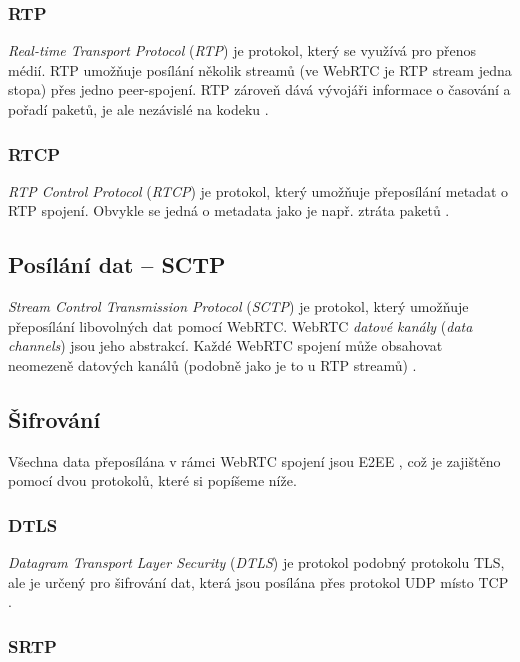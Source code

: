 \subsubsection{RTP}\label{rtp}

\textit{Real-time Transport Protocol} (\textit{RTP}) je protokol, který se
využívá pro přenos médií. RTP umožňuje posílání několik streamů (ve WebRTC je
RTP stream jedna stopa) přes jedno peer-spojení. RTP zároveň dává vývojáři
informace o časování a pořadí paketů, je ale nezávislé na kodeku
\cite{WebRTCForTheCurious}.

\subsubsection{RTCP}\label{rtcp}

\textit{RTP Control Protocol} (\textit{RTCP}) je protokol, který umožňuje
přeposílání metadat o RTP spojení. Obvykle se jedná o metadata jako je např.
ztráta paketů \cite{WebRTCForTheCurious}.

\subsection{Posílání dat -- SCTP}\label{sctp}

\textit{Stream Control Transmission Protocol} (\textit{SCTP}) je protokol, který
umožňuje přeposílání libovolných dat pomocí WebRTC. WebRTC \textit{datové
	kanály} (\textit{data channels}) jsou jeho abstrakcí. Každé WebRTC spojení může
obsahovat neomezeně datových kanálů (podobně jako je to u RTP streamů)
\cite{WebRTCForTheCurious}.

\subsection{Šifrování}

Všechna data přeposílána v rámci WebRTC spojení jsou E2EE
\cite{WebRTCForTheCurious}, což je zajištěno pomocí dvou protokolů, které si
popíšeme níže.

\subsubsection{DTLS}

\textit{Datagram Transport Layer Security} (\textit{DTLS}) je protokol podobný
protokolu TLS, ale je určený pro šifrování dat, která jsou posílána přes
protokol UDP místo TCP \cite{WebRTCForTheCurious}.

\subsubsection{SRTP}\label{srtp}

